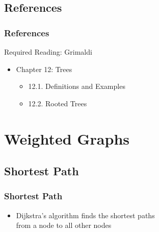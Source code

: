 \documentclass[dvipsnames]{beamer}
\begin{document}
\subsection*{References}

\begin{frame}
  \frametitle{References}

  \begin{block}{Required Reading: Grimaldi}
    \begin{itemize}
      \item Chapter 12: Trees
      \begin{itemize}
        \item 12.1. \alert{Definitions and Examples}
        \item 12.2. \alert{Rooted Trees}
      \end{itemize}
    \end{itemize}
  \end{block}
\end{frame}

\section{Weighted Graphs}

\subsection{Shortest Path}

\begin{frame}
  \frametitle{Shortest Path}

  \begin{itemize}
    \item Dijkstra's algorithm finds the shortest paths\\
      from a node to all other nodes
  \end{itemize}
\end{frame}
\end{document}
